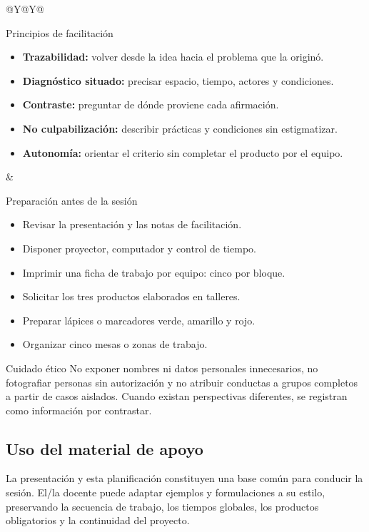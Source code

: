 \documentclass[10pt,a4paper]{article}
\begin{document}
\begin{tabularx}{\textwidth}{@{}Y@{\hspace{5mm}}Y@{}}
\begin{docbox}[height=72mm]{Principios de facilitación}
\begin{itemize}
  \item \textbf{Trazabilidad:} volver desde la idea hacia el problema que la originó.
  \item \textbf{Diagnóstico situado:} precisar espacio, tiempo, actores y condiciones.
  \item \textbf{Contraste:} preguntar de dónde proviene cada afirmación.
  \item \textbf{No culpabilización:} describir prácticas y condiciones sin estigmatizar.
  \item \textbf{Autonomía:} orientar el criterio sin completar el producto por el equipo.
\end{itemize}
\end{docbox}
&
\begin{docbox}[height=72mm]{Preparación antes de la sesión}
\begin{itemize}
  \item Revisar la presentación y las notas de facilitación.
  \item Disponer proyector, computador y control de tiempo.
  \item Imprimir una ficha de trabajo por equipo: cinco por bloque.
  \item Solicitar los tres productos elaborados en talleres.
  \item Preparar lápices o marcadores verde, amarillo y rojo.
  \item Organizar cinco mesas o zonas de trabajo.
\end{itemize}
\end{docbox}
\end{tabularx}

\begin{accentbox}{Cuidado ético}
No exponer nombres ni datos personales innecesarios, no fotografiar personas sin autorización y no atribuir conductas a grupos completos a partir de casos aislados. Cuando existan perspectivas diferentes, se registran como información por contrastar.
\end{accentbox}

\subsection{Uso del material de apoyo}
La presentación y esta planificación constituyen una base común para conducir la sesión. El/la docente puede adaptar ejemplos y formulaciones a su estilo, preservando la secuencia de trabajo, los tiempos globales, los productos obligatorios y la continuidad del proyecto.
\end{document}
